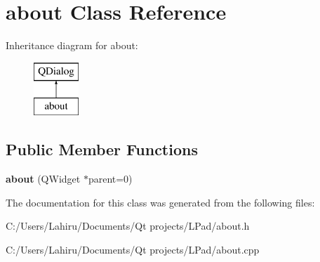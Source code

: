 \hypertarget{classabout}{}\section{about Class Reference}
\label{classabout}
Inheritance diagram for about\+:\begin{figure}[H]
\begin{center}
\leavevmode
\includegraphics[height=2.000000cm]{classabout}
\end{center}
\end{figure}
\subsection*{Public Member Functions}
\begin{DoxyCompactItemize}
\item 
\hypertarget{classabout_ab16a8ec628d97aee17f0332e09964f52}{}{\bfseries about} (Q\+Widget $\ast$parent=0)\label{classabout_ab16a8ec628d97aee17f0332e09964f52}

\end{DoxyCompactItemize}


The documentation for this class was generated from the following files\+:\begin{DoxyCompactItemize}
\item 
C\+:/\+Users/\+Lahiru/\+Documents/\+Qt projects/\+L\+Pad/about.\+h\item 
C\+:/\+Users/\+Lahiru/\+Documents/\+Qt projects/\+L\+Pad/about.\+cpp\end{DoxyCompactItemize}
